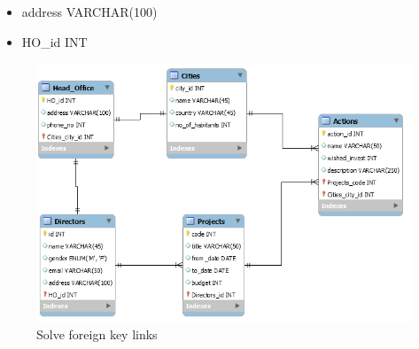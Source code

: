 \documentclass{article}
\begin{document}
\begin{itemize}
\begin{itemize}
		\item address VARCHAR(100)
		\item HO\_id INT
	\end{itemize}
\begin{figure}[h]
\centering
\includegraphics[scale = 0.6]{4.PNG}
\caption{Solve foreign key links}
\end{figure}
\end{itemize}
\newpage
\end{document}
